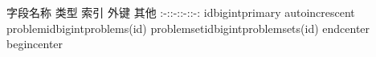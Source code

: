 {}\markdownRendererPipe{} 字段名称 \markdownRendererPipe{} 类型 \markdownRendererPipe{} 索引 \markdownRendererPipe{} 外键 \markdownRendererPipe{} 其他 \markdownRendererPipe{} \markdownRendererPipe{}:-:\markdownRendererPipe{}:-:\markdownRendererPipe{}:-:\markdownRendererPipe{}:-:\markdownRendererPipe{} \markdownRendererPipe{}id\markdownRendererPipe{}bigint\markdownRendererPipe{}primary\markdownRendererPipe{}\markdownRendererPipe{} auto\markdownRendererBackslash{}\markdownRendererUnderscore{}increscent\markdownRendererPipe{} \markdownRendererPipe{}problem\markdownRendererBackslash{}\markdownRendererUnderscore{}id\markdownRendererPipe{}bigint\markdownRendererPipe{}\markdownRendererPipe{}problems(id)\markdownRendererPipe{}\markdownRendererPipe{} \markdownRendererPipe{}problem\markdownRendererBackslash{}\markdownRendererUnderscore{}set\markdownRendererBackslash{}\markdownRendererUnderscore{}id\markdownRendererPipe{}bigint\markdownRendererPipe{}\markdownRendererPipe{}problem\markdownRendererBackslash{}\markdownRendererUnderscore{}sets(id)\markdownRendererPipe{}\markdownRendererPipe{}\markdownRendererInterblockSeparator
{}\markdownRendererBackslash{}end\markdownRendererLeftBrace{}center\markdownRendererRightBrace{}\markdownRendererInterblockSeparator
{}\markdownRendererInterblockSeparator
{}\markdownRendererBackslash{}begin\markdownRendererLeftBrace{}center\markdownRendererRightBrace{}\markdownRendererInterblockSeparator
